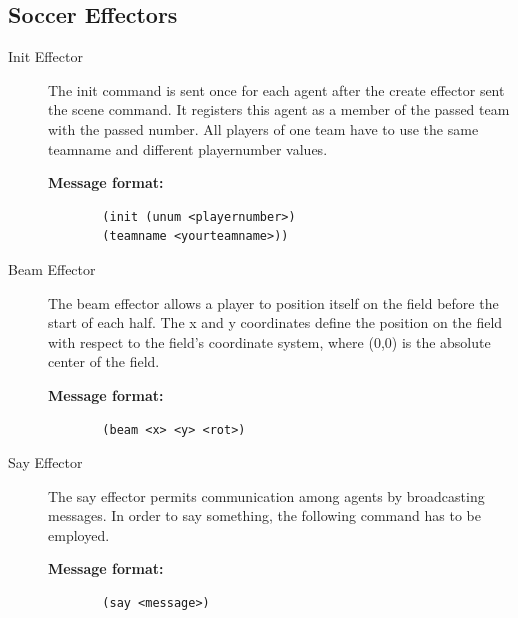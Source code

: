 \subsection{Soccer Effectors}
\begin{description}
  \item [Init Effector]
  The init command is sent once for each agent after the create effector sent the scene command. It registers this agent as a member of the passed team with the passed number. All players of one team have to use the same teamname and different playernumber values.
  \begin{description}
  \item[{\bf Message format:}]
  \begin{verbatim}
  (init (unum <playernumber>)
  (teamname <yourteamname>))
  \end{verbatim}
  \end{description}



  \item [Beam Effector]
  The beam effector allows a player to position itself on the field before the start of each half. The x and y coordinates define the position on the field with respect to the field's coordinate system, where (0,0) is the absolute center of the field.
  \begin{description}
  \item[{\bf Message format:}]
  \begin{verbatim}
  (beam <x> <y> <rot>)
  \end{verbatim}
  \end{description}



  \item [Say Effector]
  The say effector permits communication among agents by broadcasting messages. In order to say something, the following command has to be employed.
  \begin{description}
  \item[{\bf Message format:}]
  \begin{verbatim}
  (say <message>)
  \end{verbatim}
  \end{description}

\end{description}
